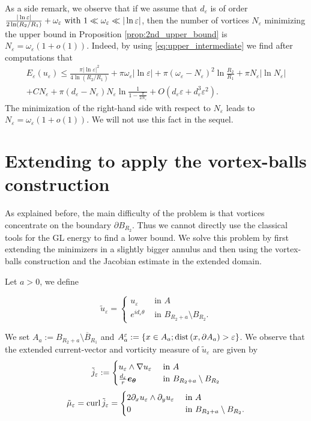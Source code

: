 \documentclass[12pt,reqno]{amsart}
\def\e {{\varepsilon}}
\renewcommand{\vec}[1]{\text{\boldmath $#1$}}
\def\dist{{\rm dist\,}}
\def\curl{{\rm curl\,}}
\def \p {\partial}
\numberwithin{equation}{section}
\begin{document}
As a side remark, we observe that if we assume that $d_\e$ is of order $  \frac{|\ln \e|}{2 \ln (R_2/R_1)}+\omega_\e \) with \(1\ll \omega_\e\ll |\ln \e|$, then the number of vortices \(N_\e\) minimizing the upper bound in Proposition \ref{prop:2nd_upper_bound} is \(N_\e=\omega_\e(1+o(1))\). Indeed, by using \eqref{eq:upper_intermediate} we find after computations that 
\begin{align}\label{eq:upper_intermediate22}
E_\e(u_\e)\leq \frac{\pi|\ln \e|^2}{4\ln (R_2/R_1)}+\pi\omega_\e|\ln \e|+\pi(\omega_\e-N_\e)^2 \ln \frac{R_2}{R_1}+\pi N_\e |\ln N_\e| \\
+CN_\e+\pi (d_\e-N_\e)N_\e \ln \frac{1}{1-\frac{\pi}{2N_\e}}+O(d_\e\e+d_\e^3\e^2). \nonumber
\end{align}
The minimization of the right-hand side with respect to \(N_\e\) leads to \(N_\e=\omega_\e(1+o(1))\). We will not use this fact in the sequel.


\section{Extending to apply the vortex-balls construction}\label{sec:tools}

 As explained before, the main difficulty of the problem is that  vortices concentrate on the boundary \(\p B_{R_2}\). Thus we cannot directly use the classical tools for the GL energy to find a lower bound. We solve this problem by first extending the minimizers in a slightly bigger annulus and then using the vortex-balls construction and the Jacobian estimate in the extended domain.

Let \(a>0\), we define

\begin{equation}\label{eq:extension}
\tilde{u}_\e=\begin{cases}
u_\e & \text{ in } A \\
e^{id_\e\theta} & \text{ in } B_{R_2+a}\setminus B_{R_2}.
\end{cases}
\end{equation}

We set   \(A_a := B_{R_2+a}\setminus \overline{B}_{R_1}\) and  \(A_a^\e:=\{ x\in A_a; \dist (x, \p A_a)>\e\}\). We observe that the extended current-vector and vorticity measure of \(\tilde{u}_\e\) are given by
\begin{equation*}
\tilde{j}_\e :=\begin{cases}
u_\e \wedge \nabla u_\e  & \text{ in } A \\
\frac{d_\e}{r}\vec{e_\theta}  & \text{ in } B_{R_2+a}\setminus B_{R_2}
\end{cases} \end{equation*}
\begin{equation*}
\tilde{\mu}_\e =\curl \tilde{j}_\e =\begin{cases}
2\p_x u_\e \wedge \p_y u_\e  & \text{ in } A \\
0 & \text{ in } B_{R_2+a}\setminus B_{R_2}.
\end{cases}
\end{equation*}
\end{document}
